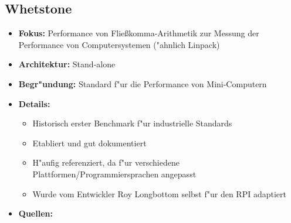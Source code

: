 \documentclass{scrartcl}
\begin{document}
\subsection{Whetstone}
\begin{itemize}
	\item \textbf{Fokus:} Performance von Flie\ss komma-Arithmetik zur Messung der Performance von Computersystemen ("ahnlich Linpack)
	\item \textbf{Architektur:} Stand-alone
	\item \textbf{Begr"undung:} Standard f"ur die Performance von Mini-Computern
	\item \textbf{Details:}
	\begin{itemize}
		\item Historisch erster Benchmark f"ur industrielle Standards 
		\item Etabliert und gut dokumentiert
		\item H"aufig referenziert, da f"ur verschiedene Plattformen/Programmiersprachen angepasst 
		\item Wurde vom Entwickler Roy Longbottom selbst f"ur den RPI adaptiert
	\end{itemize}
	\item \textbf{Quellen:} 
\end{itemize}
%
\end{document}
